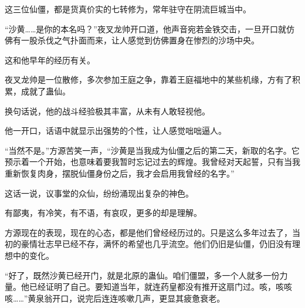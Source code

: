 \begin{this_body}
这三位仙僵，都是货真价实的七转修为，常年驻守在阴流巨城当中。

“沙黄……是你的本名吗？”夜叉龙帅开口道，他声音宛若金铁交击，一旦开口就仿佛有一股杀伐之气扑面而来，让人感觉到仿佛置身在惨烈的沙场中央。

这和他早年的经历有关。

夜叉龙帅是一位散修，多次参加王庭之争，靠着王庭福地中的某些机缘，方有了积累，成就了蛊仙。

换句话说，他的战斗经验极其丰富，从未有人敢轻视他。

他一开口，话语中就显示出强势的个性，让人感觉咄咄逼人。

“当然不是。”方源苦笑一声，“沙黄是当我成为仙僵之后的第二天，新取的名字。它预示着一个开始，也意味着要我暂时忘记过去的辉煌。我曾经对天起誓，只有当我重新恢复肉身，摆脱仙僵身份之后，我才会启用我曾经的名字。”

这话一说，议事堂的众仙，纷纷涌现出复杂的神色。

有鄙夷，有冷笑，有不语，有哀叹，更多的却是理解。

方源现在的表现，现在的心态，都是他们曾经经历过的。只是这么多年过去了，当初的豪情壮志早已经不存，满怀的希望也几乎流空。他们仍旧是仙僵，仍旧没有理想中的变化。

“好了，既然沙黄已经开门，就是北原的蛊仙。咱们僵盟，多一个人就多一份力量。他已经证明了自己。要知道当年，就连药皇都没有推开这扇门过。咳，咳咳咳……”黄泉翁开口，说完后连连咳嗽几声，更显其疲惫衰老。

\end{this_body}

